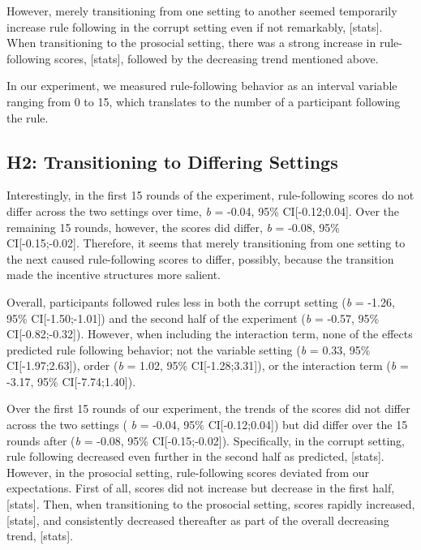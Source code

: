 \documentclass[man]{apa6}
\begin{document}
However, merely transitioning from one setting to another seemed
temporarily increase rule following in the corrupt setting even if not
remarkably, {[}stats{]}. When transitioning to the prosocial setting,
there was a strong increase in rule-following scores, {[}stats{]},
followed by the decreasing trend mentioned above.

In our experiment, we measured rule-following behavior as an interval
variable ranging from 0 to 15, which translates to the number of a
participant following the rule.

\hypertarget{h2-transitioning-to-differing-settings-1}{%
\subsection{H2: Transitioning to Differing
Settings}\label{h2-transitioning-to-differing-settings-1}}

Interestingly, in the first 15 rounds of the experiment, rule-following
scores do not differ across the two settings over time, \emph{b} =
-0.04, 95\% CI{[}-0.12;0.04{]}. Over the remaining 15 rounds, however,
the scores did differ, \emph{b} = -0.08, 95\% CI{[}-0.15;-0.02{]}.
Therefore, it seems that merely transitioning from one setting to the
next caused rule-following scores to differ, possibly, because the
transition made the incentive structures more salient.

Overall, participants followed rules less in both the corrupt setting
(\emph{b} = -1.26, 95\% CI{[}-1.50;-1.01{]}) and the second half of the
experiment (\emph{b} = -0.57, 95\% CI{[}-0.82;-0.32{]}). However, when
including the interaction term, none of the effects predicted rule
following behavior; not the variable setting (\emph{b} = 0.33, 95\%
CI{[}-1.97;2.63{]}), order (\emph{b} = 1.02, 95\% CI{[}-1.28;3.31{]}),
or the interaction term (\emph{b} = -3.17, 95\% CI{[}-7.74;1.40{]}).

Over the first 15 rounds of our experiment, the trends of the scores did
not differ across the two settings ( \emph{b} = -0.04, 95\%
CI{[}-0.12;0.04{]}) but did differ over the 15 rounds after (\emph{b} =
-0.08, 95\% CI{[}-0.15;-0.02{]}). Specifically, in the corrupt setting,
rule following decreased even further in the second half as predicted,
{[}stats{]}. However, in the prosocial setting, rule-following scores
deviated from our expectations. First of all, scores did not increase
but decrease in the first half, {[}stats{]}. Then, when transitioning to
the prosocial setting, scores rapidly increased, {[}stats{]}, and
consistently decreased thereafter as part of the overall decreasing
trend, {[}stats{]}.
\end{document}
